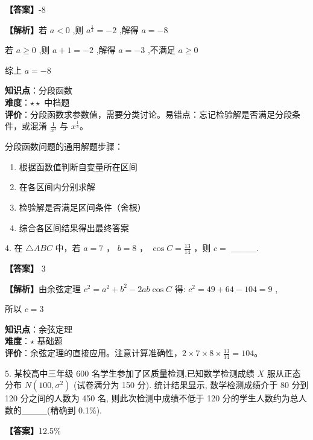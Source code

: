 \documentclass[10pt]{article}
\begin{document}
\textbf{【答案】}-8

\textbf{【解析】}若 \(a < 0\) ,则 \({a}^{\frac{1}{3}} =  - 2\) ,解得 \(a =  - 8\)

若 \(a \geq  0\) ,则 \(a + 1 =  - 2\) ,解得 \(a =  - 3\) ,不满足 \(a \geq  0\)

综上 \(a =  - 8\)

\begin{analysisbox}[考点分析]
\textbf{知识点}：分段函数\\
\textbf{难度}：\(\star\star\) 中档题\\
\textbf{评价}：分段函数求参数值，需要分类讨论。易错点：忘记检验解是否满足分段条件，或混淆 \(\frac{1}{x^3}\) 与 \(x^{\frac{1}{3}}\)。
\end{analysisbox}

\begin{tipbox}[教学提示]
分段函数问题的通用解题步骤：
\begin{enumerate}
\item 根据函数值判断自变量所在区间
\item 在各区间内分别求解
\item 检验解是否满足区间条件（舍根）
\item 综合各区间结果得出最终答案
\end{enumerate}
\end{tipbox}

4. 在 \(\bigtriangleup  {ABC}\) 中，若 \(a = 7\) ， \(b = 8\) ， \(\cos C = \frac{13}{14}\) ，则 \(c =\) \_\_\_\_.

\textbf{【答案】} 3

\textbf{【解析】}由余弦定理 \({c}^{2} = {a}^{2} + {b}^{2} - {2ab}\cos C\) 得: \({c}^{2} = {49} + {64} - {104} = 9\) ,

所以 \(c = 3\)

\begin{analysisbox}[考点分析]
\textbf{知识点}：余弦定理\\
\textbf{难度}：\(\star\) 基础题\\
\textbf{评价}：余弦定理的直接应用。注意计算准确性，\(2 \times 7 \times 8 \times \frac{13}{14} = 104\)。
\end{analysisbox}

5. 某校高中三年级 600 名学生参加了区质量检测,已知数学检测成绩 \(X\) 服从正态分布 \(N\left( {{100},{\sigma }^{2}}\right)\) (试卷满分为 150 分). 统计结果显示, 数学检测成绩介于 80 分到 120 分之间的人数为 450 名, 则此次检测中成绩不低于 120 分的学生人数约为总人数的\_\_\_\_(精确到 0.1\%).

\textbf{【答案】}12.5\%
\end{document}
